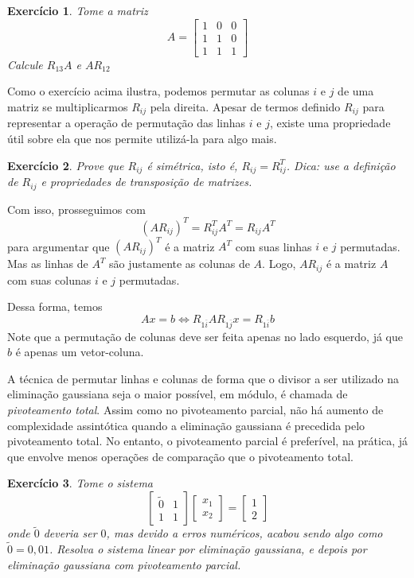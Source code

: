\documentclass[]{article}
\newtheorem{exercicio}{Exercício}
\numberwithin{equation}{section}
\begin{document}
\begin{exercicio}
	Tome a matriz
	$$
	A =
	\begin{bmatrix}
	1 & 0 & 0 \\
	1 & 1 & 0 \\
	1 & 1 & 1
	\end{bmatrix}
	$$
	Calcule $R_{13}A$ e $AR_{12}$
\end{exercicio}

Como o exercício acima ilustra, podemos permutar as colunas $i$ e $j$ de uma matriz se multiplicarmos $R_{ij}$ pela direita. Apesar de termos definido $R_{ij}$ para representar a operação de permutação das linhas $i$ e $j$, existe uma propriedade útil sobre ela que nos permite utilizá-la para algo mais.

\begin{exercicio}
	Prove que $R_{ij}$ é simétrica, isto é, $R_{ij} = R_{ij}^T$. Dica: use a definição de $R_{ij}$ e propriedades de transposição de matrizes.
\end{exercicio}

Com isso, prosseguimos com
$$
(A R_{ij})^T = R_{ij}^TA^T = R_{ij}A^T
$$
para argumentar que $(A R_{ij})^T$ é a matriz $A^T$ com suas linhas $i$ e $j$ permutadas. Mas as linhas de $A^T$ são justamente as colunas de $A$. Logo, $A R_{ij}$ é a matriz $A$ com suas colunas $i$ e $j$ permutadas.

Dessa forma, temos
$$
Ax = b \iff R_{1\overline{i}} A R_{1\overline{j}} x = R_{1\overline{i}}b
$$
Note que a permutação de colunas deve ser feita apenas no lado esquerdo, já que $b$ é apenas um vetor-coluna.

A técnica de permutar linhas e colunas de forma que o divisor a ser utilizado na eliminação gaussiana seja o maior possível, em módulo, é chamada de \emph{pivoteamento total}. Assim como no pivoteamento parcial, não há aumento de complexidade assintótica quando a eliminação gaussiana é precedida pelo pivoteamento total. No entanto, o pivoteamento parcial é preferível, na prática, já que envolve menos operações de comparação que o pivoteamento total.

\begin{exercicio}
	Tome o sistema
	$$
	\begin{bmatrix}
	\tilde{0} & 1 \\
	1 & 1
	\end{bmatrix}
	\begin{bmatrix}
	x_1 \\
	x_2
	\end{bmatrix}
	=
	\begin{bmatrix}
	1 \\
	2
	\end{bmatrix}
	$$
	onde $\tilde{0}$ deveria ser $0$, mas devido a erros numéricos, acabou sendo algo como $\tilde{0} = 0,01$. Resolva o sistema linear por eliminação gaussiana, e depois por eliminação gaussiana com pivoteamento parcial.
\end{exercicio}
\end{document}
